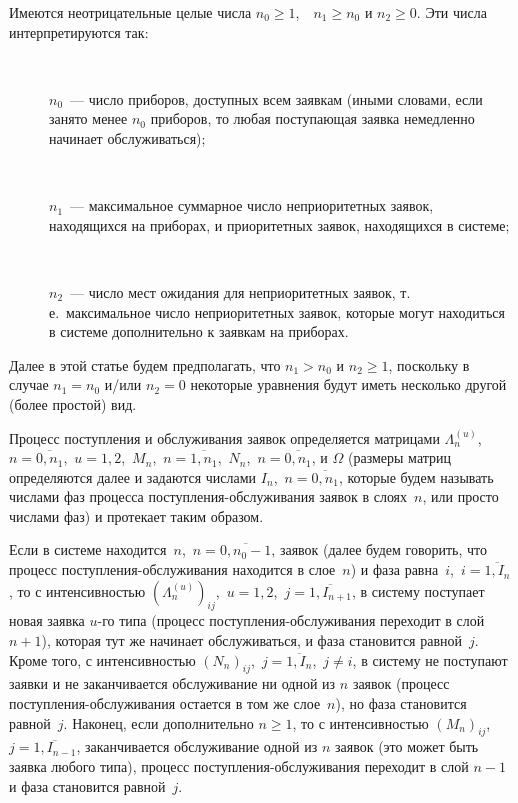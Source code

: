 \begin{multicols}{2}
Имеются неотрицательные целые числа $n_0\ge 1$,\ \ $n_1\ge n_0$ и
$n_2\ge 0$.
Эти числа интерпретируются так:
\begin{description}
\item[\,] $n_0$~--- число приборов, доступных всем заявкам (иными
словами, если занято менее $n_0$ приборов, то любая
поступающая заявка немедленно начинает обслуживаться);
\item[\,]
$n_1$~--- максимальное суммарное число неприоритетных заявок,
находящихся на приборах, и приоритетных заявок, находящихся
в системе;
\item[\,]
$n_2$~--- число мест ожидания для неприоритетных заявок,
т.\,е.\ максимальное число не\-при\-о\-ри\-тет\-ных заявок,
которые могут находиться в системе дополнительно к
заявкам на приборах.
\end{description}

Далее в этой статье будем предполагать, что $n_1>n_0$ и $n_2\ge 1$,
поскольку в случае $n_1=n_0$ и/или $n_2=0$ некоторые уравнения будут
иметь несколько другой (более простой) вид.

Процесс поступления и обслуживания заявок определяется матрицами
$\Lambda^{(u)}_n$,\ $n=\overline{0,n_1}$,\  $u=1,2$,\ 
$M_n$,\  $n=\overline{1,n_1}$,\ 
$N_n$,\  $n=\overline{0,n_1}$, и
$\Omega$ (размеры мат\-риц определяются далее и задаются числами
$I_n$,\  $n=\overline{0,n_1}$, которые будем называть
числами фаз процесса по\-ступ\-ле\-ния-об\-слу\-жи\-ва\-ния заявок
в слоях~$n$, или просто числами фаз) и протекает таким образом.

Если в системе находится~$n$,\  $n=\overline{0,n_0-1}$,
заявок (далее будем говорить, что процесс по\-ступ\-ле\-ния-об\-слу\-жи\-ва\-ния
находится в слое~$n$) и фаза равна~$i$,\  $i=\overline{1,I_n}$,
то с интенсивностью $(\Lambda^{(u)}_n)_{ij}$,\  $u=1,2$,\ 
$j=\overline{1,I_{n+1}}$, в систему поступает новая заявка $u$-го типа
(процесс по\-ступ\-ле\-ния-об\-слу\-жи\-ва\-ния переходит в слой $n+1$), которая
тут же начинает обслуживаться,  и фаза становится равной~$j$.
Кроме того, с интенсивностью $(N_n)_{ij}$,\  $j=\overline{1,I_n}$,\ 
$j\ne i$, в систему не поступают
заявки и не заканчивается обслуживание ни одной из $n$ заявок
(процесс поступления-обслуживания остается в том же слое~$n$),
но фаза становится равной~$j$.
Наконец, если дополнительно $n\ge 1$, то с интенсивностью
$(M_n)_{ij}$,\  $j=\overline{1,I_{n-1}}$, заканчивается
обслуживание одной из $n$ заявок (это может быть заявка любого
типа), процесс поступления-обслуживания переходит в слой $n-1$
и фаза становится равной~$j$.


\end{multicols}
